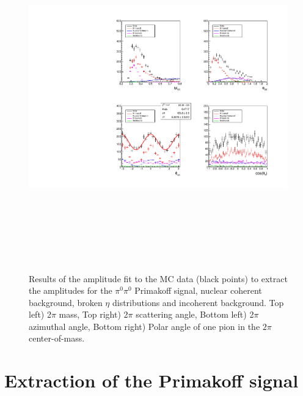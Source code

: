  \begin{figure}[tbp]
\begin{center}
\includegraphics[height=15cm,clip=true]{figures/twopi_primakoff_DSelect_test_File_100000_decomposition_PrimNCICeta.pdf}
\caption{Results of the amplitude fit to the MC data (black points) to extract the amplitudes for the $\pi^0\pi^0$ Primakoff signal, nuclear coherent background, broken $\eta$ distributions and incoherent background.
Top left) 2$\pi$ mass, Top right) 2$\pi$ scattering angle, Bottom left) 2$\pi$ azimuthal angle, 
Bottom right) Polar angle of one pion in the $2\pi$ center-of-mass.
\label{fig:decomposition_PrimNCICeta}}
\end{center} 
\end{figure}

\section{Extraction of the Primakoff signal \label{sec:signalfit}}

